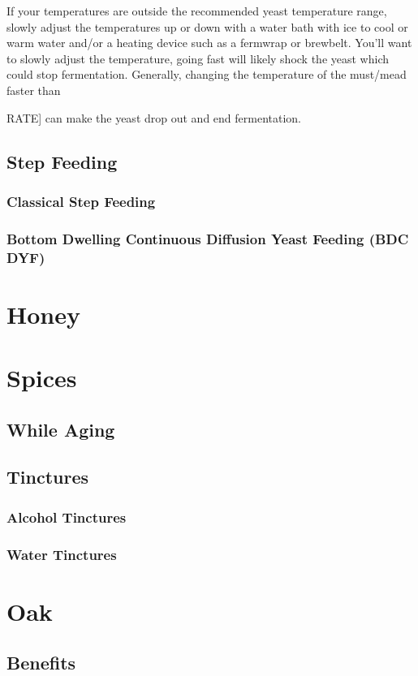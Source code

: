 \documentclass{article}
\begin{document}
   If your temperatures are outside the recommended yeast temperature range, slowly adjust the temperatures up or down with a water bath with ice to cool or 
   warm water and/or a heating device such as a fermwrap or brewbelt. You'll want to slowly adjust the temperature, going fast will likely shock the yeast which
   could stop fermentation. Generally, changing the temperature of the must/mead faster than {RATE] can make the yeast drop out and end fermentation.

 \subsection{Step Feeding}
  \subsubsection{Classical Step Feeding}
  \subsubsection{Bottom Dwelling Continuous Diffusion Yeast Feeding (BDC DYF)}

\section{Honey}

\section{Spices}
 \subsection{While Aging}
 \subsection{Tinctures}
  \subsubsection{Alcohol Tinctures}
  \subsubsection{Water Tinctures}

\section{Oak}
 \subsection{Benefits}
}
\end{document}
